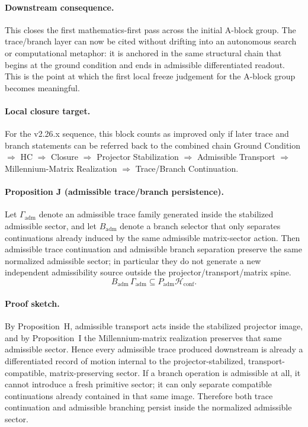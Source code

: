 \documentclass[12pt,a4paper]{article}
\begin{document}
\paragraph{Downstream consequence.}
This closes the first mathematics-first pass across the initial A-block group.
The trace/branch layer can now be cited without drifting into an autonomous
search or computational metaphor: it is anchored in the same structural chain
that begins at the ground condition and ends in admissible differentiated
readout. This is the point at which the first local freeze judgement for the
A-block group becomes meaningful.

\paragraph{Local closure target.}
For the v2.26.x sequence, this block counts as improved only if later trace and
branch statements can be referred back to the combined chain
Ground Condition $\Rightarrow$ HC $\Rightarrow$ Closure $\Rightarrow$
Projector Stabilization $\Rightarrow$ Admissible Transport $\Rightarrow$
Millennium-Matrix Realization $\Rightarrow$ Trace/Branch Continuation.


\paragraph{Proposition J (admissible trace/branch persistence).}
Let $\Gamma_{\mathrm{adm}}$ denote an admissible trace family generated inside the stabilized admissible sector, and let $B_{\mathrm{adm}}$ denote a branch selector that only separates continuations already induced by the same admissible matrix-sector action. Then admissible trace continuation and admissible branch separation preserve the same normalized admissible sector; in particular they do not generate a new independent admissibility source outside the projector/transport/matrix spine.
\[
B_{\mathrm{adm}}\,\Gamma_{\mathrm{adm}}\subseteq P_{\mathrm{adm}}\mathcal H_{\mathrm{conf}}.
\]

\paragraph{Proof sketch.}
By Proposition~H, admissible transport acts inside the stabilized projector image, and by Proposition~I the Millennium-matrix realization preserves that same admissible sector. Hence every admissible trace produced downstream is already a differentiated record of motion internal to the projector-stabilized, transport-compatible, matrix-preserving sector. If a branch operation is admissible at all, it cannot introduce a fresh primitive sector; it can only separate compatible continuations already contained in that same image. Therefore both trace continuation and admissible branching persist inside the normalized admissible sector.
\end{document}
